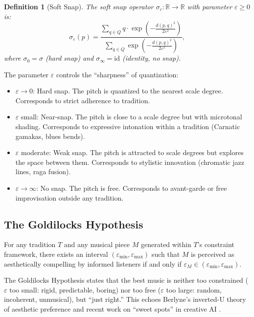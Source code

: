 \documentclass[cmj]{article}
\newtheorem{definition}{Definition}
\newcommand{\eps}{\varepsilon}
\newcommand{\R}{\mathbb{R}}
\begin{document}
\begin{definition}[Soft Snap]
The \emph{soft snap} operator $\sigma_\eps: \R \to \R$ with parameter
$\eps \geq 0$ is:
\[
  \sigma_\eps(p) = \frac{\displaystyle\sum_{q \in Q} q \cdot \exp\!\left(
  -\frac{d(p, q)^2}{2\eps^2}\right)}{\displaystyle\sum_{q \in Q} \exp\!\left(
  -\frac{d(p, q)^2}{2\eps^2}\right)},
\]
where $\sigma_0 = \sigma$ (hard snap) and $\sigma_\infty = \mathrm{id}$
(identity, no snap).
\end{definition}

The parameter $\eps$ controls the ``sharpness'' of quantization:
\begin{itemize}[nosep]
  \item $\eps \to 0$: Hard snap. The pitch is quantized to the nearest scale
    degree. Corresponds to strict adherence to tradition.
  \item $\eps$ small: Near-snap. The pitch is close to a scale degree but
    with microtonal shading. Corresponds to expressive intonation within a
    tradition (Carnatic gamakas, blues bends).
  \item $\eps$ moderate: Weak snap. The pitch is attracted to scale degrees
    but explores the space between them. Corresponds to stylistic innovation
    (chromatic jazz lines, raga fusion).
  \item $\eps \to \infty$: No snap. The pitch is free. Corresponds to
    avant-garde or free improvisation outside any tradition.
\end{itemize}

\subsection{The Goldilocks Hypothesis}

\begin{conjecture}
For any tradition $T$ and any musical piece $M$ generated within $T$'s
constraint framework, there exists an interval $(\eps_{\min}, \eps_{\max})$
such that $M$ is perceived as aesthetically compelling by informed listeners if
and only if $\eps_M \in (\eps_{\min}, \eps_{\max})$.
\end{conjecture}

The Goldilocks Hypothesis states that the best music is neither too
constrained ($\eps$ too small: rigid, predictable, boring) nor too free
($\eps$ too large: random, incoherent, unmusical), but ``just right.'' This
echoes Berlyne's inverted-U theory of aesthetic preference
\citep{berlyne1971aesthetics} and recent work on ``sweet spots'' in creative
AI \citep{boden2004creative}.
\end{document}
